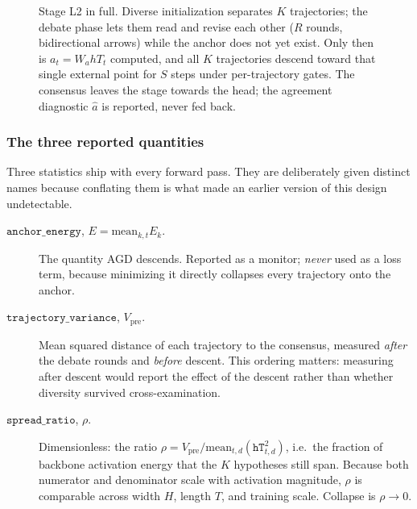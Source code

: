 \documentclass[11pt,a4paper]{article}
\newcommand{\Hdim}{H}
\newcommand{\Vdim}{V}
\newcommand{\rhodim}{\rho}
\theoremstyle{plain}
\theoremstyle{definition}
\theoremstyle{remark}
\begin{document}
\begin{figure}[htbp]
\caption{Stage L2 in full. Diverse initialization separates $K$ trajectories;
the debate phase lets them read and revise each other ($R$ rounds, bidirectional
arrows) while the anchor does not yet exist. Only then is $a_t = W_a hT_t$
computed, and all $K$ trajectories descend toward that single external point for
$S$ steps under per-trajectory gates. The consensus leaves the stage towards
the head; the agreement diagnostic $\hat a$ is reported, never fed back.}
\label{fig:sandbox}
\end{figure}

\subsubsection{The three reported quantities}

\noindent
Three statistics ship with every forward pass. They are deliberately given
distinct names because conflating them is what made an earlier version of this
design undetectable.

\begin{description}
  \item[$\texttt{anchor\_energy}$, $E = \mathrm{mean}_{k,t} E_k$.] The
    quantity AGD descends. Reported as a monitor; \emph{never} used as a loss
    term, because minimizing it directly collapses every trajectory onto the
    anchor.
  \item[$\texttt{trajectory\_variance}$, $V_{\mathrm{pre}}$.] Mean squared
    distance of each trajectory to the consensus, measured \emph{after} the
    debate rounds and \emph{before} descent. This ordering matters: measuring
    after descent would report the effect of the descent rather than whether
    diversity survived cross-examination.
  \item[$\texttt{spread\_ratio}$, $\rhodim$.] Dimensionless: the
    ratio $\rhodim = V_{\mathrm{pre}} / \mathrm{mean}_{t,d}(\texttt{hT}_{t,d}^2)$,
    i.e.\ the fraction of backbone activation energy that the $K$ hypotheses
    still span. Because both numerator and denominator scale with activation magnitude,
    $\rhodim$ is comparable across width $H$, length $T$, and training scale.
    Collapse is $\rhodim \to 0$.
\end{description}
\end{document}
